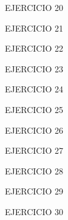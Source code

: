 \documentclass[11pt]{article}
\begin{document}
EJERCICIO 20

EJERCICIO 21
\begin{coq_example}

\end{coq_example}

EJERCICIO 22
\begin{coq_example}

\end{coq_example}

EJERCICIO 23
\begin{coq_example}

\end{coq_example}

EJERCICIO 24
\begin{coq_example}

\end{coq_example}

EJERCICIO 25
\begin{coq_example}

\end{coq_example}

EJERCICIO 26
\begin{coq_example}

\end{coq_example}

EJERCICIO 27
\begin{coq_example}

\end{coq_example}

EJERCICIO 28
\begin{coq_example}

\end{coq_example}

EJERCICIO 29
\begin{coq_example}

\end{coq_example}

EJERCICIO 30
\begin{coq_example}

\end{coq_example}
\end{document}

